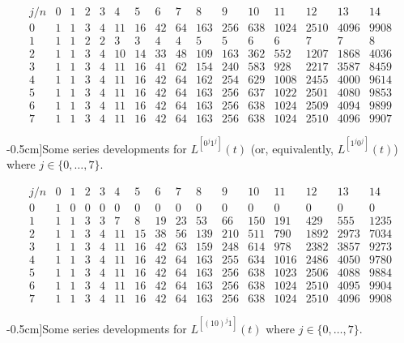 \begin{table}
\begin{equation*}\begin{array}{c|ccccccccccccccc}j/n & 0 & 1 & 2 & 3 & 4 & 5 & 6 & 7 & 8 & 9 & 10 & 11 & 12 & 13 & 14\\\hline0 & 1 & 1 & 3 & 4 & 11 & 16 & 42 & 64 & 163 & 256 & 638 & 1024 & 2510 & 4096 & 9908\\1 & 1 & 1 & 2 & 2 & 3 & 3 & 4 & 4 & 5 & 5 & 6 & 6 & 7 & 7 & 8\\2 & 1 & 1 & 3 & 4 & 10 & 14 & 33 & 48 & 109 & 163 & 362 & 552 & 1207 & 1868 & 4036\\3 & 1 & 1 & 3 & 4 & 11 & 16 & 41 & 62 & 154 & 240 & 583 & 928 & 2217 & 3587 & 8459\\4 & 1 & 1 & 3 & 4 & 11 & 16 & 42 & 64 & 162 & 254 & 629 & 1008 & 2455 & 4000 & 9614\\5 & 1 & 1 & 3 & 4 & 11 & 16 & 42 & 64 & 163 & 256 & 637 & 1022 & 2501 & 4080 & 9853\\6 & 1 & 1 & 3 & 4 & 11 & 16 & 42 & 64 & 163 & 256 & 638 & 1024 & 2509 & 4094 & 9899\\7 & 1 & 1 & 3 & 4 & 11 & 16 & 42 & 64 & 163 & 256 & 638 & 1024 & 2510 & 4096 & 9907\end{array}\end{equation*}
\caption[][-0.5cm]{Some series developments for $L^{[0^{j}1^j]}(t)$ (or, equivalently,
$L^{[1^{j}0^j]}(t)$) where $j\in \lbrace 0,\ldots,7 \rbrace$.}
\label{tbl:L0_j:1_j}
\end{table}

\begin{table}
\begin{equation*}\begin{array}{c|ccccccccccccccc}j/n & 0 & 1 & 2 & 3 & 4 & 5 & 6 & 7 & 8 & 9 & 10 & 11 & 12 & 13 & 14\\\hline0 & 1 & 0 & 0 & 0 & 0 & 0 & 0 & 0 & 0 & 0 & 0 & 0 & 0 & 0 & 0\\1 & 1 & 1 & 3 & 3 & 7 & 8 & 19 & 23 & 53 & 66 & 150 & 191 & 429 & 555 & 1235\\2 & 1 & 1 & 3 & 4 & 11 & 15 & 38 & 56 & 139 & 210 & 511 & 790 & 1892 & 2973 & 7034\\3 & 1 & 1 & 3 & 4 & 11 & 16 & 42 & 63 & 159 & 248 & 614 & 978 & 2382 & 3857 & 9273\\4 & 1 & 1 & 3 & 4 & 11 & 16 & 42 & 64 & 163 & 255 & 634 & 1016 & 2486 & 4050 & 9780\\5 & 1 & 1 & 3 & 4 & 11 & 16 & 42 & 64 & 163 & 256 & 638 & 1023 & 2506 & 4088 & 9884\\6 & 1 & 1 & 3 & 4 & 11 & 16 & 42 & 64 & 163 & 256 & 638 & 1024 & 2510 & 4095 & 9904\\7 & 1 & 1 & 3 & 4 & 11 & 16 & 42 & 64 & 163 & 256 & 638 & 1024 & 2510 & 4096 & 9908\end{array}\end{equation*}
\caption[][-0.5cm]{Some series developments for $L^{[(10)^{j}1]}(t)$ where $j\in \lbrace 0,\ldots,7 \rbrace$.}
\label{tbl:L10_j:1}
\end{table}

